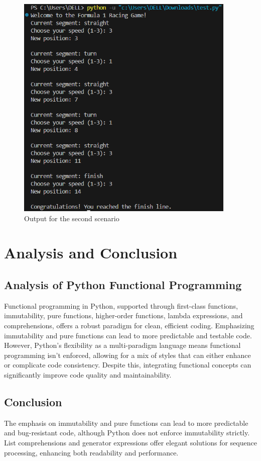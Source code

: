 \documentclass[12pt]{article}
\begin{document}
\begin{figure}[h!]
\begin{center}
\includegraphics[width=10.5cm]{output2.png}\\
Output for the second scenario
\end{center}
\end{figure}


\section{Analysis and Conclusion}
\subsection{Analysis of Python Functional Programming}
Functional programming in Python, supported through first-class functions, immutability, pure functions, higher-order functions, lambda expressions, and comprehensions, offers a robust paradigm for clean, efficient coding. Emphasizing immutability and pure functions can lead to more predictable and testable code. However, Python's flexibility as a multi-paradigm language means functional programming isn't enforced, allowing for a mix of styles that can either enhance or complicate code consistency. Despite this, integrating functional concepts can significantly improve code quality and maintainability.

\subsection{Conclusion}
The emphasis on immutability and pure functions can lead to more predictable and bug-resistant code, although Python does not enforce immutability strictly. List comprehensions and generator expressions offer elegant solutions for sequence processing, enhancing both readability and performance.\\
\end{document}
